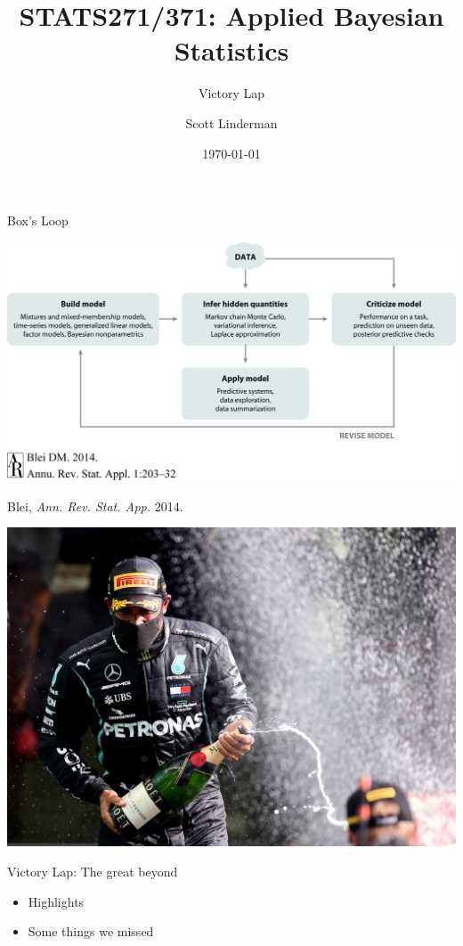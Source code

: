 \documentclass[aspectratio=169]{beamer}
\title{STATS271/371: Applied Bayesian Statistics}
\subtitle{Victory Lap}
\author{Scott Linderman}
\date{\today}
\begin{document}
\maketitle

\begin{frame}{Box's Loop}
\begin{center}
\includegraphics[width=.85\linewidth]{figures/lap1/boxsloop.jpeg}\\
\end{center} 
\begin{flushright}
{\footnotesize Blei, \textit{Ann. Rev. Stat. App.} 2014.}
\end{flushright}
\end{frame}

\begin{frame}{}
    \centering
    \includegraphics[width=.8\textwidth]{figures/lap9/hamilton.jpeg}
\end{frame}

\begin{frame}{Victory Lap: The great beyond}
\begin{itemize}
    \item Highlights
    \item Some things we missed
\end{itemize}
\end{frame}
\end{document}
